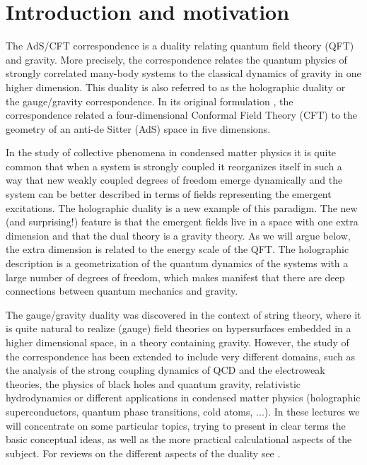 \documentclass[12pt,notitlepage,a4paper]{article}
\begin{document}
\newpage

\tableofcontents




\section{Introduction and motivation}
\label{sec:1}
The AdS/CFT correspondence is a duality relating quantum field theory (QFT) and gravity. More precisely, the correspondence  relates the quantum physics of strongly correlated many-body systems to the classical dynamics of gravity in one higher dimension. This duality is also referred to as the holographic duality or the gauge/gravity correspondence. In its original formulation \cite{Maldacena:1997re,Gubser:1998bc,Witten:1998qj}, the correspondence related a four-dimensional Conformal Field Theory (CFT) to the geometry of an anti-de Sitter (AdS) space in five dimensions. 

In the study of collective phenomena in condensed matter physics it is quite common that when a system is strongly coupled it reorganizes itself in such a way that new weakly coupled degrees of freedom emerge dynamically and the system can be better described in terms of  fields representing the emergent excitations. The holographic duality is a new example of this paradigm.  The new (and surprising!) feature is that the emergent fields live in a space with one extra dimension and that the dual theory is a gravity theory. As we will argue below, the extra dimension is related to the energy scale of the QFT. The holographic description is a geometrization of the quantum dynamics of the systems with a large number of degrees of freedom, which makes manifest that there are deep connections between quantum mechanics and gravity. 


The gauge/gravity duality was discovered in the context of string theory, where it is quite natural to realize (gauge) field theories on hypersurfaces embedded in a higher dimensional space, in a theory containing gravity.  However, the study of the correspondence  has been extended to include very different domains, such as the analysis of the strong coupling dynamics  of QCD and the electroweak theories, the physics of black holes and quantum gravity, relativistic hydrodynamics or different applications in condensed matter physics (holographic superconductors, quantum phase transitions, cold atoms, ...).  In these lectures we will concentrate on some particular topics, trying to present in clear terms the basic conceptual ideas, as well as the more practical calculational aspects of the subject.  For reviews on the different aspects of the duality see \cite{Aharony:1999ti,D'Hoker:2002aw,Hartnoll:2009sz,McGreevy:2009xe,CasalderreySolana:2011us,Kim:2012ey,Adams:2012th}. 
\end{document}
